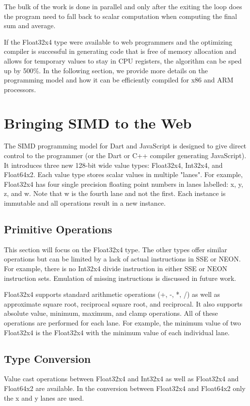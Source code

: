 \documentclass[preprint]{sigplanconf}
\begin{document}
The bulk of the work is done in parallel and only after the exiting the loop does the program need to fall back to scalar computation when computing the final sum and average.

If the Float32x4 type were available to web programmers and the optimizing compiler is successful in generating code that is free of memory allocation and allows for temporary values to stay in CPU registers, the algorithm can be sped up by 500\%. In the following section, we provide more details on the programming model and how it can be efficiently compiled for x86 and ARM processors.

\section{Bringing SIMD to the Web}
The SIMD programming model for Dart and JavaScript is designed to give direct control to the programmer (or the Dart or C++ compiler generating JavaScript). It introduces three new 128-bit wide value types: Float32x4, Int32x4, and Float64x2. Each value type stores scalar values in multiple "lanes". For example, Float32x4 has four single precision floating point numbers in lanes labelled: x, y, z, and w. Note that w is the fourth lane and not the first. Each instance is immutable and all operations result in a new instance.

\subsection{Primitive Operations}
This section will focus on the Float32x4 type. The other types offer similar operations but can be limited by a lack of actual instructions in SSE or NEON. For example, there is no Int32x4 divide instruction in either SSE or NEON instruction sets. Emulation of missing instructions is discussed in future work.

Float32x4 supports standard arithmetic operations (+, -, *, /) as well as approximate square root, reciprocal square root, and reciprocal. It also supports absolute value, minimum, maximum, and clamp operations. All of these operations are performed for each lane. For example, the minimum value of two Float32x4 is the Float32x4 with the minimum value of each individual lane.

\subsection{Type Conversion}
Value cast operations between Float32x4 and Int32x4 as well as Float32x4 and Float64x2 are available. In the conversion between Float32x4 and Float64x2 only the x and y lanes are used.
\end{document}

